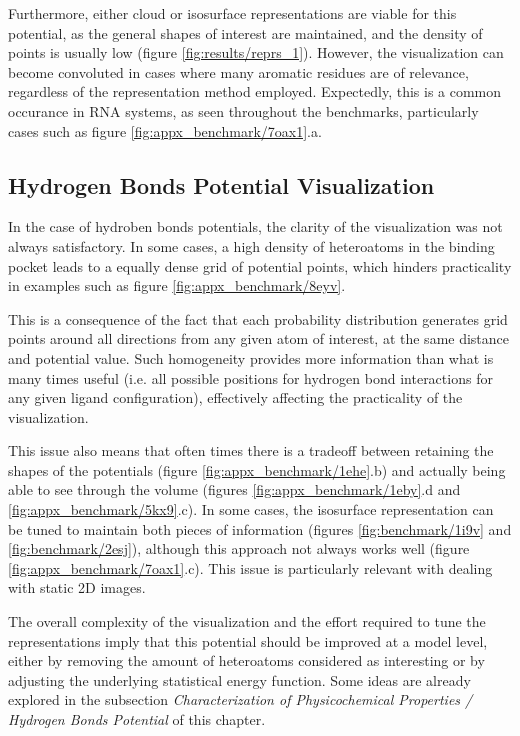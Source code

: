     Furthermore, either cloud or isosurface representations are viable for this potential, as the general shapes of interest are maintained, and the density of points is usually low (figure \ref{fig:results/reprs_1}). However, the visualization can become convoluted in cases where many aromatic residues are of relevance, regardless of the representation method employed. Expectedly, this is a common occurance in RNA systems, as seen throughout the benchmarks, particularly cases such as figure \ref{fig:appx_benchmark/7oax1}.a.

  \subsection{Hydrogen Bonds Potential Visualization}
    In the case of hydroben bonds potentials, the clarity of the visualization was not always satisfactory. In some cases, a high density of heteroatoms in the binding pocket leads to a equally dense grid of potential points, which hinders practicality in examples such as figure \ref{fig:appx_benchmark/8eyv}.

    This is a consequence of the fact that each probability distribution generates grid points around all directions from any given atom of interest, at the same distance and potential value. Such homogeneity provides more information than what is many times useful (i.e. all possible positions for hydrogen bond interactions for any given ligand configuration), effectively affecting the practicality of the visualization.

    This issue also means that often times there is a tradeoff between retaining the shapes of the potentials (figure \ref{fig:appx_benchmark/1ehe}.b) and actually being able to see through the volume (figures \ref{fig:appx_benchmark/1eby}.d and \ref{fig:appx_benchmark/5kx9}.c). In some cases, the isosurface representation can be tuned to maintain both pieces of information (figures \ref{fig:benchmark/1i9v} and \ref{fig:benchmark/2esj}), although this approach not always works well (figure \ref{fig:appx_benchmark/7oax1}.c). This issue is particularly relevant with dealing with static 2D images.

    The overall complexity of the visualization and the effort required to tune the representations imply that this potential should be improved at a model level, either by removing the amount of heteroatoms considered as interesting or by adjusting the underlying statistical energy function. Some ideas are already explored in the subsection \textit{Characterization of Physicochemical Properties / Hydrogen Bonds Potential} of this chapter.

